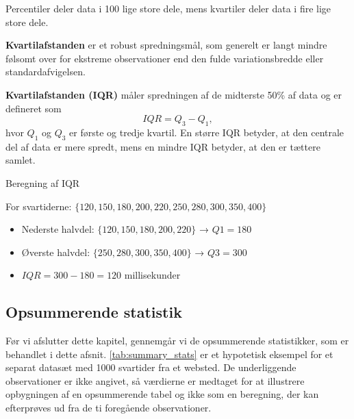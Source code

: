 Percentiler deler data i 100 lige store dele, mens kvartiler deler data i fire lige store dele.

\textbf{Kvartilafstanden} er et robust spredningsmål, som generelt er langt mindre følsomt over for ekstreme observationer end den fulde variationsbredde eller standardafvigelsen.

\begin{definition}[Kvartilafstand]
    \textbf{Kvartilafstanden (IQR)} måler spredningen af de midterste 50\% af data og er defineret som
    $$
    IQR = Q_3 - Q_1,
    $$
    hvor $Q_1$ og $Q_3$ er første og tredje kvartil. En større IQR betyder, at den centrale del af data er mere spredt, mens en mindre IQR betyder, at den er tættere samlet.
\end{definition}
    

\begin{example} Beregning af IQR

For svartiderne: $\{120, 150, 180, 200, 220, 250, 280, 300, 350, 400\}$

\begin{itemize}
    \item Nederste halvdel: $\{120, 150, 180, 200, 220\}$ → $Q1 = 180$
    \item Øverste halvdel: $\{250, 280, 300, 350, 400\}$ → $Q3 = 300$
    \item $IQR = 300 - 180 = 120$ millisekunder
\end{itemize}
\end{example}


\subsection*{Opsummerende statistik}

Før vi afslutter dette kapitel, gennemgår vi de opsummerende statistikker, som er behandlet i dette afsnit. \autoref{tab:summary_stats} er et hypotetisk eksempel for et separat datasæt med 1000 svartider fra et websted. De underliggende observationer er ikke angivet, så værdierne er medtaget for at illustrere opbygningen af en opsummerende tabel og ikke som en beregning, der kan efterprøves ud fra de ti foregående observationer.

